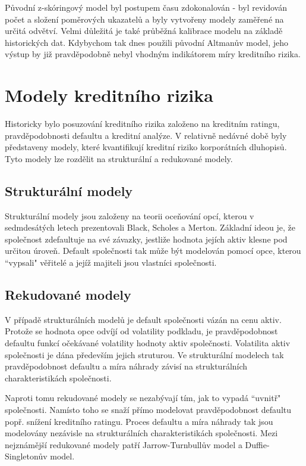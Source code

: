 \documentclass[a4paper]{book}
\begin{document}
Původní z-skóringový model byl postupem času zdokonalován - byl revidován počet a složení poměrových ukazatelů a byly vytvořeny modely zaměřené na určitá odvětví. Velmi důležitá je také průběžná kalibrace modelu na základě historických dat. Kdybychom tak dnes použili původní Altmanův model, jeho výstup by již pravděpodobně nebyl vhodným indikátorem míry kreditního rizika.

\section{Modely kreditního rizika}

Historicky bylo posuzování kreditního rizika založeno na kreditním ratingu, pravděpodobnosti defaultu a kreditní analýze. V relativně nedávné době byly představeny modely, které kvantifikují kreditní riziko korporátních dluhopisů. Tyto modely lze rozdělit na strukturální a redukované modely.

\subsection{Strukturální modely}

Strukturální modely jsou založeny na teorii oceňování opcí, kterou v sedmdesátých letech prezentovali Black, Scholes a Merton. Základní ideou je, že společnost zdefaultuje na své závazky, jestliže hodnota jejích aktiv klesne pod určitou úroveň. Default společnosti tak může být modelován pomocí opce, kterou ``vypsali" věřitelé a jejíž majiteli jsou vlastníci společnosti.

\subsection{Rekudované modely}

V případě strukturálních modelů je default společnosti vázán na cenu aktiv. Protože se hodnota opce odvíjí od volatility podkladu, je pravděpodobnost defaultu funkcí očekávané volatility hodnoty aktiv společnosti. Volatilita aktiv společnosti je dána především jejich struturou. Ve strukturální modelech tak pravděpodobnost defaultu a míra náhrady závisí na strukturálních charakteristikách společnosti.

Naproti tomu rekudované modely se nezabývají tím, jak to vypadá ``uvnitř" společnosti. Namísto toho se snaží přímo modelovat pravděpodobnost defaultu popř. snížení kreditního ratingu. Proces defaultu a míra náhrady tak jsou modelovány nezávisle na strukturálních charakteristikách společnosti. Mezi nejznámější redukované modely patří Jarrow-Turnbullův model a Duffie-Singletonův model.
\end{document}
